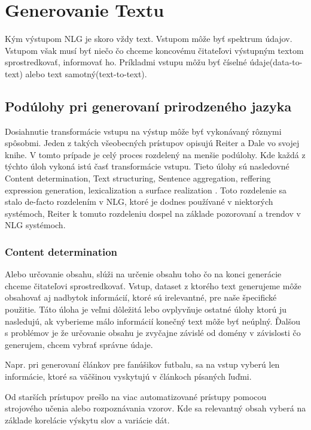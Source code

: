 \section{Generovanie Textu}

Kým výstupom NLG je skoro vždy text. Vstupom môže byť spektrum údajov. Vstupom však musí byť niečo čo chceme koncovému čitateľovi výstupným textom sprostredkovať, informovať ho. Príkladmi vstupu môžu byť číselné údaje(data-to-text) alebo text samotný(text-to-text)\cite{roger_paul_2002_whatisnlg}.

\subsection{Podúlohy pri generovaní prirodzeného jazyka}
Dosiahnutie transformácie vstupu na výstup môže byť vykonávaný rôznymi spôsobmi. Jeden z takých všeobecných prístupov opisujú Reiter a Dale vo svojej knihe\cite{reiter_dale_2000_buildingnlgsystems}. V tomto prípade je celý proces rozdelený na menšie podúlohy. Kde každá z týchto úloh vykoná istú časť transformácie vstupu. Tieto úlohy sú nasledovné Content determination, Text structuring, Sentence aggregation, reffering expression generation, lexicalization a surface realization \cite{reiter_dale_2000_buildingnlgsystems}. Toto rozdelenie sa stalo de-facto rozdelením v NLG, ktoré je dodnes používané v niektorých systémoch, Reiter k tomuto rozdeleniu dospel na základe pozorovaní a trendov v NLG systémoch.

\subsubsection{Content determination}
Alebo určovanie obsahu, slúži na určenie obsahu toho čo na konci generácie chceme čitateľovi sprostredkovať. Vstup, dataset z ktorého text generujeme môže obsahovať aj nadbytok informácií, ktoré sú irelevantné, pre naše špecifické použitie. Táto úloha je veľmi dôležitá lebo ovplyvňuje ostatné úlohy ktorú ju nasledujú, ak vyberieme málo informácií konečný text môže byť neúplný. Ďalšou s problémov je že určovanie obsahu je zvyčajne závislé od domény v závislosti čo generujem, chcem vybrať správne údaje.

Napr. pri generovaní článkov pre fanúšikov futbalu\cite{vanderlee_krahmer_wubben_2017_PASS}, sa na vstup vyberú len informácie, ktoré sa väčšinou vyskytujú v článkoch písaných ľuďmi.

 Od starších prístupov prešlo na viac automatizované prístupy pomocou strojového učenia alebo rozpoznávania vzorov. Kde sa relevantný obsah vyberá na základe korelácie výskytu slov a variácie dát\cite{perera_2017_recentnlgadv}.

